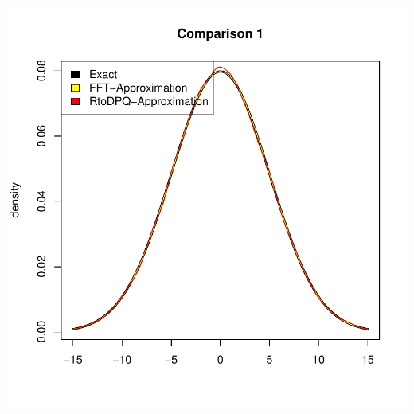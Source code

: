 \documentclass[11pt]{article}
\begin{document}
\includegraphics{distr-ComparisonFFTandRtoDPQ}
\end{document}
